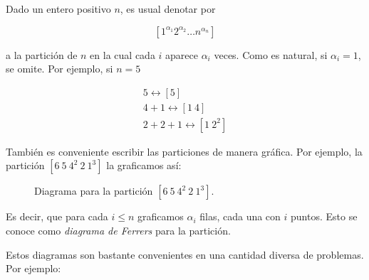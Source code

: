 \begin{notn}
    Dado un entero positivo $n$, es usual denotar por
    
    \[
    [1^{\alpha_1}2^{\alpha_2} \dots n^{\alpha_n}]
    \]
    
    \noindent a la partición de $n$ en la cual cada $i$ aparece $\alpha_i$ veces. Como es natural, si $\alpha_i=1$, se omite. Por ejemplo, si $n = 5$
    
    \begin{gather*}
        5 \leftrightarrow [5] \\
        4 + 1 \leftrightarrow [1 \ 4] \\
        2 + 2 + 1 \leftrightarrow [1 \ 2^2]
    \end{gather*}
    
    También es conveniente escribir las particiones de manera gráfica. Por ejemplo, la partición $[6 \ 5 \ 4^2 \ 2 \ 1^3]$ la graficamos así:
    
    \vspace{5mm}
    
    \begin{figure}
        \centering
        \begin{ferrers}
                   
        \end{ferrers}
        \caption{Diagrama para la partición $[6 \ 5 \ 4^2 \ 2 \ 1^3]$.}
        \label{fig:ferrers1}
    \end{figure}
    
    Es decir, que para cada $i \leq n$ graficamos $\alpha_i$ filas, cada una con $i$ puntos. Esto se conoce como \textit{diagrama de Ferrers} para la partición.
\end{notn}

Estos diagramas son bastante convenientes en una cantidad diversa de problemas. Por ejemplo:

